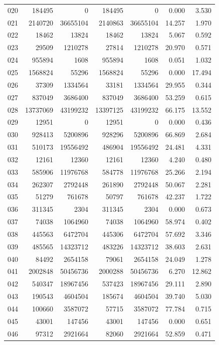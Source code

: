 \begin{longtable}{lrrrrrr}
020 & 184495 & 0 & 184495 & 0 & 0.000 & 3.530\\
021 & 2140720 & 36655104 & 2140863 & 36655104 & 14.257 & 1.970\\
022 & 18462 & 13824 & 18462 & 13824 & 5.067 & 0.592\\
023 & 29509 & 1210278 & 27814 & 1210278 & 20.970 & 0.571\\
024 & 955894 & 1608 & 955894 & 1608 & 0.051 & 1.032\\
025 & 1568824 & 55296 & 1568824 & 55296 & 0.000 & 17.494\\
026 & 37309 & 1334564 & 33181 & 1334564 & 29.955 & 0.344\\
027 & 837049 & 3686400 & 837049 & 3686400 & 53.259 & 0.615\\
028 & 13737069 & 43199232 & 13397125 & 43199232 & 66.175 & 13.552\\
029 & 12951 & 0 & 12951 & 0 & 0.000 & 0.436\\
030 & 928413 & 5200896 & 928296 & 5200896 & 66.869 & 2.684\\
031 & 510173 & 19556492 & 486904 & 19556492 & 24.481 & 4.331\\
032 & 12161 & 12360 & 12161 & 12360 & 4.240 & 0.480\\
033 & 585906 & 11976768 & 584778 & 11976768 & 25.266 & 2.194\\
034 & 262307 & 2792448 & 261890 & 2792448 & 50.067 & 2.281\\
035 & 51279 & 761678 & 50797 & 761678 & 42.237 & 1.722\\
036 & 311345 & 2304 & 311345 & 2304 & 0.000 & 0.673\\
037 & 74038 & 1064960 & 74038 & 1064960 & 58.974 & 0.402\\
038 & 445563 & 6472704 & 445306 & 6472704 & 57.692 & 3.346\\
039 & 485565 & 14323712 & 483226 & 14323712 & 38.603 & 2.631\\
040 & 84492 & 2654158 & 79061 & 2654158 & 24.049 & 1.278\\
041 & 2002848 & 50456736 & 2000288 & 50456736 & 6.270 & 12.862\\
042 & 540347 & 18967456 & 537423 & 18967456 & 29.111 & 2.890\\
043 & 190543 & 4604504 & 185674 & 4604504 & 39.740 & 5.030\\
044 & 100660 & 3587072 & 57715 & 3587072 & 77.784 & 0.715\\
045 & 43001 & 147456 & 43001 & 147456 & 0.000 & 0.651\\
046 & 97312 & 2921664 & 82060 & 2921664 & 52.859 & 0.471\\

\end{longtable}

